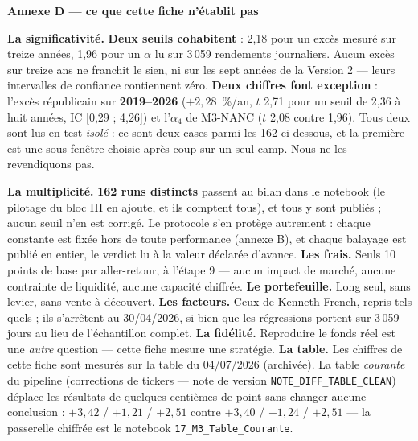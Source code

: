 \documentclass[9pt,a4paper]{extarticle}
\begin{document}
\vspace{0.8mm}
{\color{bleu}\bfseries Annexe D --- ce que cette fiche n'établit pas}\par
\vspace{0.6mm}
{\footnotesize
\textbf{La significativité.} \textbf{Deux seuils cohabitent} : 2,18 pour un excès mesuré sur treize années,
1,96 pour un $\alpha$ lu sur 3\,059 rendements journaliers. Aucun excès sur treize ans ne franchit le sien, ni
sur les sept années de la Version 2 --- leurs intervalles de confiance contiennent zéro. \textbf{Deux chiffres
font exception} : l'excès républicain sur \textbf{2019--2026} ($+2{,}28$~\%/an, $t$ 2,71 pour un seuil de 2,36
à huit années, IC [0,29 ; 4,26]) et l'$\alpha_4$ de M3-NANC ($t$ 2,08 contre 1,96). Tous deux sont lus en test
\emph{isolé} : ce sont deux cases parmi les 162 ci-dessous, et la première est une sous-fenêtre choisie après
coup sur un seul camp. Nous ne les revendiquons pas.\par
\vspace{0.5mm}
\textbf{La multiplicité.} \textbf{162 runs distincts} passent au bilan dans le notebook (le pilotage du
bloc III en ajoute, et ils comptent tous), et tous y sont publiés ;
aucun seuil n'en est corrigé. Le protocole s'en protège autrement : chaque constante est fixée hors de toute
performance (annexe B), et chaque balayage est publié en entier, le verdict lu à la valeur déclarée d'avance.
\textbf{Les frais.} Seuls 10 points de base par aller-retour, à l'étape 9 --- aucun impact de marché, aucune
contrainte de liquidité, aucune capacité chiffrée. \textbf{Le portefeuille.} Long seul, sans levier, sans
vente à découvert. \textbf{Les facteurs.} Ceux de Kenneth French, repris tels quels ; ils s'arrêtent au
30/04/2026, si bien que les régressions portent sur 3\,059 jours au lieu de l'échantillon complet.
\textbf{La fidélité.} Reproduire le fonds réel est une \emph{autre} question --- cette fiche mesure une
stratégie.
\textbf{La table.} Les chiffres de cette fiche sont mesurés sur la table du 04/07/2026 (archivée).
La table \emph{courante} du pipeline (corrections de tickers --- note de version
\texttt{NOTE\_DIFF\_TABLE\_CLEAN}) déplace les résultats de quelques centièmes de point sans changer
aucune conclusion : $+3{,}42$ / $+1{,}21$ / $+2{,}51$ contre $+3{,}40$ / $+1{,}24$ / $+2{,}51$ ---
la passerelle chiffrée est le notebook \texttt{17\_M3\_Table\_Courante}.\par
}
\end{document}
